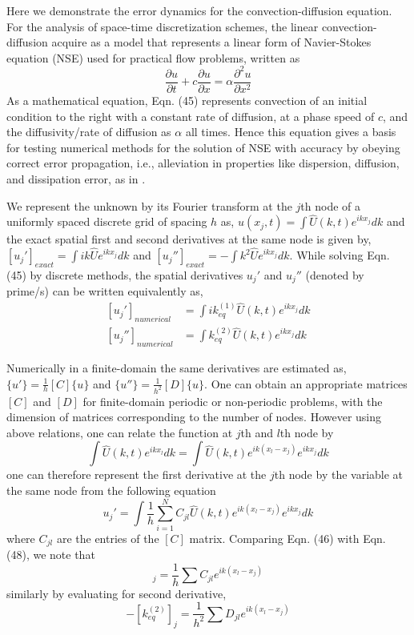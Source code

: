 \documentclass[showpacs,preprintnumbers,amsmath,amssymb]{revtex4-1} %
\begin{document}
Here we demonstrate the error dynamics for the convection-diffusion equation. For the analysis of space-time discretization schemes, the linear convection-diffusion acquire as a model that represents a linear form of Navier-Stokes equation (NSE) used for practical flow problems, written as
\begin{equation}
\frac{\partial u}{\partial t}+c\frac{\partial u}{\partial x}=\alpha \frac{\partial^2 u}{\partial x^2}
\end{equation}
As a mathematical equation, Eqn. (45) represents convection of an initial condition to the right with a constant rate of diffusion, at a phase speed of $c$, and the diffusivity/rate of diffusion as $\alpha$ all times. Hence this equation gives a basis for testing numerical methods for the solution of NSE with accuracy by obeying correct error propagation, i.e., alleviation in properties like dispersion, diffusion, and dissipation error, as in \cite{SENGUPTA_et_al_2, SENGUPTA_et_al_3}.

We represent the unknown by its Fourier transform at the $j$th node of a uniformly spaced discrete grid of spacing $h$ as, $u(x_j,t)=\int \hat{U}(k,t)e^{ikx_j}dk$ and the exact spatial first and second derivatives at the same node is given by, $[u_j']_{exact}=\int ik\hat{U}e^{ikx_j}dk$ and $[u_j'']_{exact}=-\int k^2\hat{U}e^{ikx_j}dk$. While solving Eqn. (45) by discrete methods, the spatial derivatives $u_j'$ and $u_j''$ (denoted by prime/s) can be written equivalently as,
\begin{equation}
\begin{aligned}
[u_j']_{numerical}&=\int ik_{eq}^{(1)}\hat{U}(k,t)e^{ikx_j}dk \\
[u_j'']_{numerical}&=\int k_{eq}^{(2)}\hat{U}(k,t)e^{ikx_j}dk
\end{aligned}
\end{equation}

Numerically in a finite-domain the same derivatives are estimated as, $\{u'\}=\frac{1}{h}[C]\{u\}$ and $\{u''\}=\frac{1}{h^2}[D]\{u\}$. One can obtain an appropriate matrices $[C]$ and $[D]$ for finite-domain periodic or non-periodic problems, with the dimension of matrices corresponding to the number of nodes. However using above relations, one can relate the function at $j$th and $l$th node by 
\begin{equation}
\int \hat{U}(k,t)e^{ikx_l}dk=\int \hat{U}(k,t)e^{ik(x_l-x_j)}e^{ikx_j}dk
\end{equation}
one can therefore represent the first derivative at the $j$th node by the variable at the same node from the following equation
\begin{equation}
u_j'=\int \frac{1}{h} \sum_{i=1}^{N} C_{jl}\hat{U}(k,t) e^{ik(x_l-x_j)}e^{ikx_j}dk
\end{equation}
where $C_{jl}$ are the entries of the $[C]$ matrix. Comparing Eqn. (46) with Eqn. (48), we note that 
\begin{equation}
[ik_{eq}^{(1)}]_j=\frac{1}{h} \sum C_{jl}e^{ik(x_l-x_j)}
\end{equation}
similarly by evaluating for second derivative,
\begin{equation}
-[k_{eq}^{(2)}]_j=\frac{1}{h^2} \sum D_{jl}e^{ik(x_l-x_j)}
\end{equation}
\end{document}
